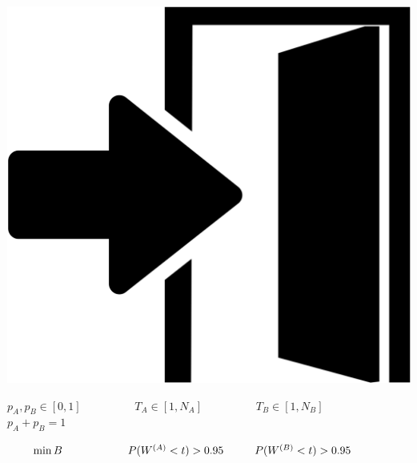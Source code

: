 \begin{frame}
    \includegraphics[scale=0.04]{Bin/game_avatars/door.png}

    \(p_A, p_B \in [0, 1] \hspace{2cm} T_A \in [1, N_A]
    \hspace{2cm} T_B \in [1, N_B]\)
    \(p_A + p_B = 1 \hspace{8cm}\)

    \vspace{1cm}
    \small
    \(
        \qquad \min B \hspace{2.1cm} P(W^{(A)} < t) > 0.95
        \hspace{1cm} P(W^{(B)} < t) > 0.95
    \)
\end{frame}



